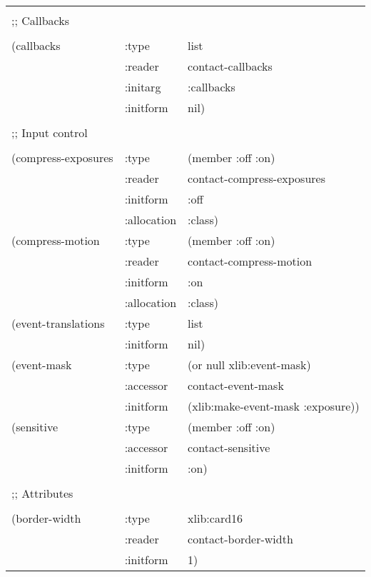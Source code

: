\documentclass[twoside]{book}
\begin{document}
\begin{sloppy}
\begin{flushright}
\parbox[t]{6.125in}{
\tt
\begin{tabular}{lll}
\raggedright
&\\
;; Callbacks \\
&\\
   (callbacks &          :type & list \\
&                        :reader &  contact-callbacks \\
&                        :initarg & :callbacks \\
&                        :initform &  nil) \\
&\\
;; Input control\\
&\\  
   (compress-exposures & :type & (member :off :on) \\
&                        :reader &  contact-compress-exposures \\
&                        :initform &  :off \\
&                        :allocation &  :class) \\
   (compress-motion &    :type & (member :off :on) \\
&                        :reader & contact-compress-motion \\
&                        :initform & :on \\
&                        :allocation & :class) \\ 
   (event-translations & :type & list \\
&                        :initform & nil) \\ 
   (event-mask &         :type & (or null xlib:event-mask) \\
&                        :accessor & contact-event-mask \\
&                        :initform & (xlib:make-event-mask :exposure)) \\
   (sensitive &          :type & (member :off :on) \\
&                        :accessor & contact-sensitive \\
&                        :initform & :on) \\
&\\
;; Attributes \\
&\\
   (border-width &       :type & xlib:card16 \\
&                        :reader & contact-border-width \\
&                        :initform & 1) \\

\end{tabular}}
\end{flushright}
\end{sloppy}
\end{document}
